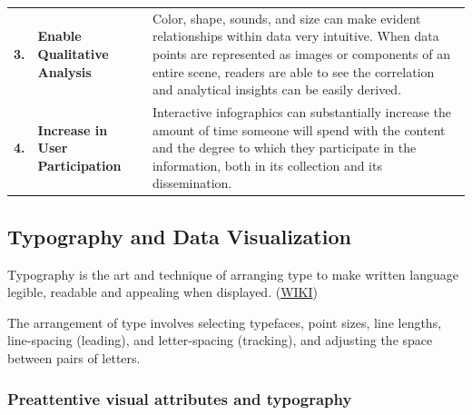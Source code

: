 \documentclass[]{book}
\begin{document}
\begin{longtable}[]{@{}lll@{}}
\begin{minipage}[t]{0.04\columnwidth}\raggedright
\textbf{3.}\strut
\end{minipage} & \begin{minipage}[t]{0.10\columnwidth}\raggedright
\textbf{Enable Qualitative Analysis}\strut
\end{minipage} & \begin{minipage}[t]{0.76\columnwidth}\raggedright
Color, shape, sounds, and size can make evident relationships within data very intuitive. When data points are represented as images or components of an entire scene, readers are able to see the correlation and analytical insights can be easily derived.\strut
\end{minipage}\tabularnewline
\begin{minipage}[t]{0.04\columnwidth}\raggedright
\textbf{4.}\strut
\end{minipage} & \begin{minipage}[t]{0.10\columnwidth}\raggedright
\textbf{Increase in User Participation}\strut
\end{minipage} & \begin{minipage}[t]{0.76\columnwidth}\raggedright
Interactive infographics can substantially increase the amount of time someone will spend with the content and the degree to which they participate in the information, both in its collection and its dissemination.\strut
\end{minipage}\tabularnewline
\bottomrule
\end{longtable}

\hypertarget{typography-and-data-visualization}{%
\subsection{Typography and Data Visualization}\label{typography-and-data-visualization}}

Typography is the art and technique of arranging type to make written language legible, readable and appealing when displayed. (\href{https://en.wikipedia.org/wiki/Typography}{WIKI})

The arrangement of type involves selecting typefaces, point sizes, line lengths, line-spacing (leading), and letter-spacing (tracking), and adjusting the space between pairs of letters.

\hypertarget{preattentive-visual-attributes-and-typography}{%
\subsubsection{Preattentive visual attributes and typography}\label{preattentive-visual-attributes-and-typography}}
\end{document}
